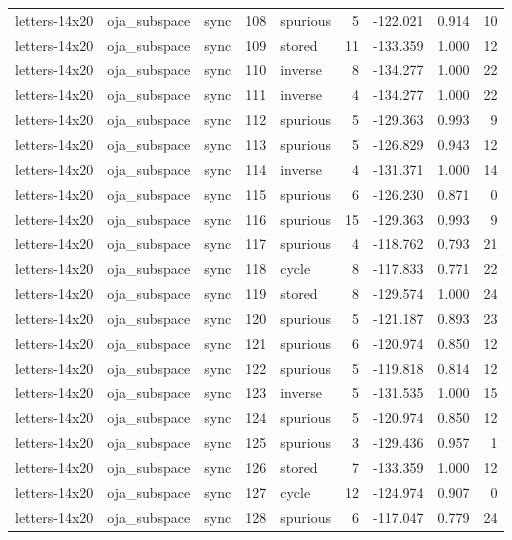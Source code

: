 \begin{tabular}{lllrlrrrr}
letters-14x20 & oja\_subspace & sync & 108 & spurious & 5 & -122.021 & 0.914 & 10 \\
letters-14x20 & oja\_subspace & sync & 109 & stored & 11 & -133.359 & 1.000 & 12 \\
letters-14x20 & oja\_subspace & sync & 110 & inverse & 8 & -134.277 & 1.000 & 22 \\
letters-14x20 & oja\_subspace & sync & 111 & inverse & 4 & -134.277 & 1.000 & 22 \\
letters-14x20 & oja\_subspace & sync & 112 & spurious & 5 & -129.363 & 0.993 & 9 \\
letters-14x20 & oja\_subspace & sync & 113 & spurious & 5 & -126.829 & 0.943 & 12 \\
letters-14x20 & oja\_subspace & sync & 114 & inverse & 4 & -131.371 & 1.000 & 14 \\
letters-14x20 & oja\_subspace & sync & 115 & spurious & 6 & -126.230 & 0.871 & 0 \\
letters-14x20 & oja\_subspace & sync & 116 & spurious & 15 & -129.363 & 0.993 & 9 \\
letters-14x20 & oja\_subspace & sync & 117 & spurious & 4 & -118.762 & 0.793 & 21 \\
letters-14x20 & oja\_subspace & sync & 118 & cycle & 8 & -117.833 & 0.771 & 22 \\
letters-14x20 & oja\_subspace & sync & 119 & stored & 8 & -129.574 & 1.000 & 24 \\
letters-14x20 & oja\_subspace & sync & 120 & spurious & 5 & -121.187 & 0.893 & 23 \\
letters-14x20 & oja\_subspace & sync & 121 & spurious & 6 & -120.974 & 0.850 & 12 \\
letters-14x20 & oja\_subspace & sync & 122 & spurious & 5 & -119.818 & 0.814 & 12 \\
letters-14x20 & oja\_subspace & sync & 123 & inverse & 5 & -131.535 & 1.000 & 15 \\
letters-14x20 & oja\_subspace & sync & 124 & spurious & 5 & -120.974 & 0.850 & 12 \\
letters-14x20 & oja\_subspace & sync & 125 & spurious & 3 & -129.436 & 0.957 & 1 \\
letters-14x20 & oja\_subspace & sync & 126 & stored & 7 & -133.359 & 1.000 & 12 \\
letters-14x20 & oja\_subspace & sync & 127 & cycle & 12 & -124.974 & 0.907 & 0 \\
letters-14x20 & oja\_subspace & sync & 128 & spurious & 6 & -117.047 & 0.779 & 24 \\

\end{tabular}
